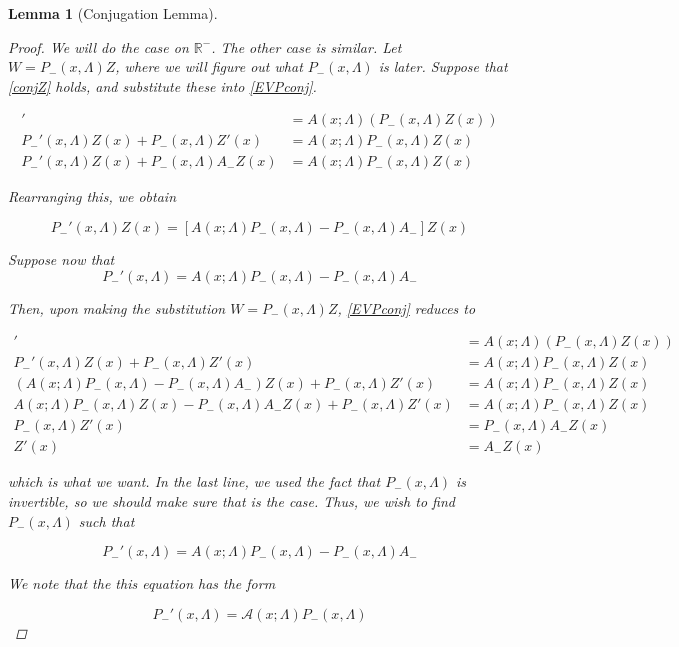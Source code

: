 \documentclass[12pt]{article}
\def\R{{\mathbb R}}
\newtheorem{lemma}{Lemma}
\begin{document}
\begin{lemma}[Conjugation Lemma]
\begin{proof}
We will do the case on $\R^-$. The other case is similar. 
Let $W = P_-(x, \Lambda) Z$, where we will figure out what $P_-(x, \Lambda)$ is later. Suppose that \eqref{conjZ} holds, and substitute these into \eqref{EVPconj}.

\begin{align*}
[P_-(x, \Lambda) Z(x)]' &= A(x; \Lambda)(P_-(x, \Lambda) Z(x)) \\
P_-'(x, \Lambda) Z(x) + P_-(x, \Lambda) Z'(x)
&= A(x; \Lambda)P_-(x, \Lambda) Z(x) \\
P_-'(x, \Lambda) Z(x) + P_-(x, \Lambda) A_- Z(x)
&= A(x; \Lambda)P_-(x, \Lambda) Z(x)
\end{align*}

Rearranging this, we obtain

\begin{equation}
P_-'(x, \Lambda) Z(x)
= [A(x; \Lambda)P_-(x, \Lambda) - P_-(x, \Lambda) A_-]Z(x)
\end{equation}

Suppose now that
\[
P_-'(x, \Lambda) = A(x; \Lambda)P_-(x, \Lambda) - P_-(x, \Lambda) A_-
\]

Then, upon making the substitution $W = P_-(x, \Lambda) Z$, \eqref{EVPconj} reduces to

\begin{align*}
[P_-(x, \Lambda) Z(x)]' &= A(x; \Lambda)(P_-(x, \Lambda) Z(x)) \\
P_-'(x, \Lambda) Z(x) + P_-(x, \Lambda) Z'(x)
&= A(x; \Lambda)P_-(x, \Lambda) Z(x) \\
(A(x; \Lambda)P_-(x, \Lambda) - P_-(x, \Lambda) A_-)Z(x) + P_-(x, \Lambda) Z'(x)
&= A(x; \Lambda)P_-(x, \Lambda) Z(x) \\
A(x; \Lambda)P_-(x, \Lambda)Z(x) - P_-(x, \Lambda) A_- Z(x) + P_-(x, \Lambda) Z'(x)
&= A(x; \Lambda)P_-(x, \Lambda) Z(x) \\
P_-(x, \Lambda) Z'(x) &= P_-(x, \Lambda) A_- Z(x) \\
Z'(x) &= A_- Z(x)
\end{align*}

which is what we want. In the last line, we used the fact that $P_-(x, \Lambda)$ is invertible, so we should make sure that is the case. Thus, we wish to find $P_-(x, \Lambda)$ such that

\[
P_-'(x, \Lambda) = A(x; \Lambda)P_-(x, \Lambda) - P_-(x, \Lambda) A_-
\]

We note that the this equation has the form 

\begin{equation}\label{solvePminus}
P_-'(x, \Lambda) = \mathcal{A}(x; \Lambda) P_-(x, \Lambda)
\end{equation}


\end{proof}
\end{lemma}
\end{document}
